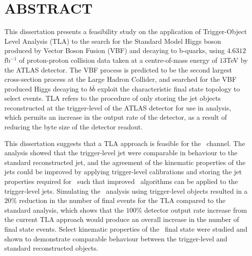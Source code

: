 \chapter*{ABSTRACT}


This dissertation presents a feasibility study on the application of Trigger-Object Level Analysis (TLA) to the search for the Standard Model Higgs boson produced by Vector Boson Fusion (VBF) and decaying to b-quarks, using $4.6312$fb$^{-1}$ of proton-proton collision data taken at a centre-of-mass energy of $13$TeV by the ATLAS detector. The VBF process is predicted to be the second largest cross-section process at the Large Hadron Collider, and searched for the VBF produced Higgs decaying to $b\bar{b}$ exploit the characteristic final state topology to select events. TLA refers to the procedure of only storing the jet objects reconstructed at the trigger-level of the ATLAS detector for use in analysis, which permits an increase in the output rate of the detector, as a result of reducing the byte size of the detector readout.

This dissertation suggests that a TLA approach is feasible for the \VBFHBB\ channel. The analysis showed that the trigger-level jet were comparable in behaviour to the standard reconstructed jet, and the agreement of the kinematic properties of the jets could be improved by applying trigger-level calibrations and storing the jet properties required for \btag\ such that improved \btag\ algorithms can be applied to the trigger-level jets. Simulating the \VBFHBB\ analysis using trigger-level objects resulted in a $20\%$ reduction in the number of final events for the TLA compared to the standard analysis, which shows that the $100\%$ detector output rate increase from the current TLA approach would produce an overall increase in the number of final state events. Select kinematic properties of the \VBFHBB\ final state were studied and shown to demonstrate comparable behaviour between the trigger-level and standard reconstructed objects.

\cleardoublepage

\endinput

